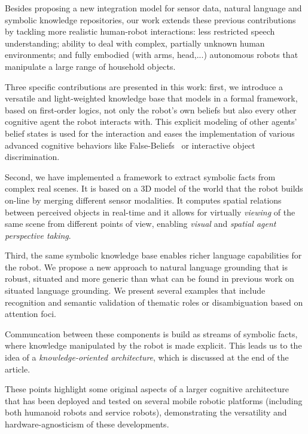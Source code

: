 
Besides proposing a new integration model for sensor data, natural language and
symbolic knowledge repositories, our work extends these previous contributions
by tackling more realistic human-robot interactions: less restricted speech
understanding; ability to deal with complex, partially unknown human
environments; and fully embodied (with arms, head,...) autonomous robots that
manipulate a large range of household objects.

Three specific contributions are presented in this work: first, we introduce a
versatile and light-weighted knowledge base that models in a formal framework,
based on first-order logics, not only the robot's own beliefs but also every
other cognitive agent the robot interacts with.  This explicit modeling of
other agents' belief states is used for the interaction and eases the
implementation of various advanced cognitive behaviors like
False-Beliefs~\cite{Leslie2000} or interactive object discrimination.

Second, we have implemented a framework to extract symbolic facts from complex
real scenes. It is based on a 3D model of the world that the robot builds
on-line by merging different sensor modalities. It computes spatial relations
between perceived objects in real-time and it allows for virtually \emph{viewing}
of the same scene from different points of view, enabling \emph{visual} and
\emph{spatial agent perspective taking}.

Third, the same symbolic knowledge base enables richer language capabilities
for the robot.  We propose a new approach to natural language grounding that is
robust, situated and more generic than what can be found in previous work
on situated language grounding. We present several examples that include
recognition and semantic validation of thematic roles or disambiguation
based on attention foci.

Communcation between these components is build as streams of symbolic facts,
where knowledge manipulated by the robot is made explicit.
This leads us to the idea of a \emph{knowledge-oriented architecture}, which is
discussed at the end of the article.

These points highlight some original aspects of a larger cognitive architecture
that has been deployed and tested on several mobile robotic platforms
(including both humanoid robots and service robots), demonstrating the
versatility and hardware-agnosticism of these developments.


